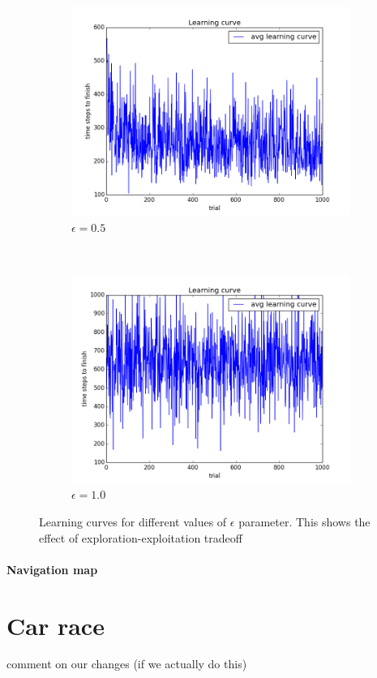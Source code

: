 \begin{figure}[h!]
\begin{subfigure}[b]{0.4\textwidth}
    \includegraphics[width=\textwidth]{figures/epsilon_5_learning_curve.png}
    \caption{\label{fig:eps5}$\epsilon = 0.5$}
\end{subfigure}
~
\begin{subfigure}[b]{0.4\textwidth}
    \includegraphics[width=\textwidth]{figures/epsilon_10_learning_curve.png}
    \caption{\label{fig:eps10}$\epsilon = 1.0$}
\end{subfigure}
\caption{\label{fig:eps}Learning curves for different values of $\epsilon$
parameter. This shows the effect of exploration-exploitation tradeoff}
\end{figure}
 

\paragraph{Navigation map}


\section{Car race}
comment on our changes (if we actually do this)
